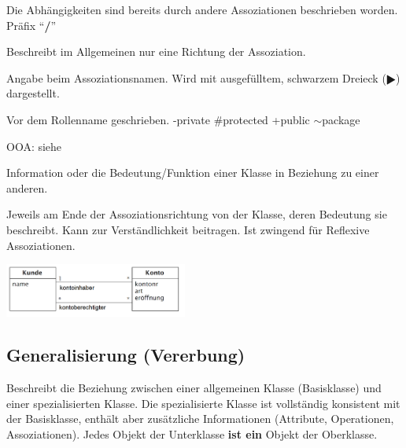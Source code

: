 \begin{description}
    \item[abgeleitete Assoziation] 
      Die Abhängigkeiten sind bereits durch andere Assoziationen beschrieben worden.
      Präfix "`\textbf{/}"'
    \item[Assoziationsname] 
      Beschreibt im Allgemeinen nur eine Richtung der Assoziation. 
    \item[Leserichtung] 
      Angabe beim Assoziationsnamen. Wird mit ausgefülltem, schwarzem Dreieck ($\RHD$) dargestellt.
    \item[Sichtbarkeit] 
      Vor dem Rollenname geschrieben. -private \#protected +public $\sim$package
    \item[Eigenschaftswert] 
      OOA: siehe 
      
    \parbox{8cm}{
      \item[Rolle]
        Information oder die Bedeutung/Funktion einer Klasse in Beziehung zu einer anderen.
      \item[Rollenname]
        Jeweils am Ende der Assoziationsrichtung von der Klasse, 
        deren Bedeutung sie beschreibt. Kann zur Verständlichkeit beitragen. Ist zwingend für Reflexive Assoziationen.}
    \hspace{0.5cm}
    \parbox{6cm}{\includegraphics[width=6cm]{./bilder/Rolle.png}}
  \end{description}

\subsection{Generalisierung (Vererbung) }
  Beschreibt die Beziehung zwischen einer allgemeinen Klasse (Basisklasse) und
  einer spezialisierten Klasse. Die spezialisierte Klasse ist vollständig
  konsistent mit der Basisklasse, enthält aber zusätzliche Informationen
  (Attribute, Operationen, Assoziationen). Jedes Objekt der Unterklasse \textbf{ist ein} 
  Objekt der Oberklasse.
   	
